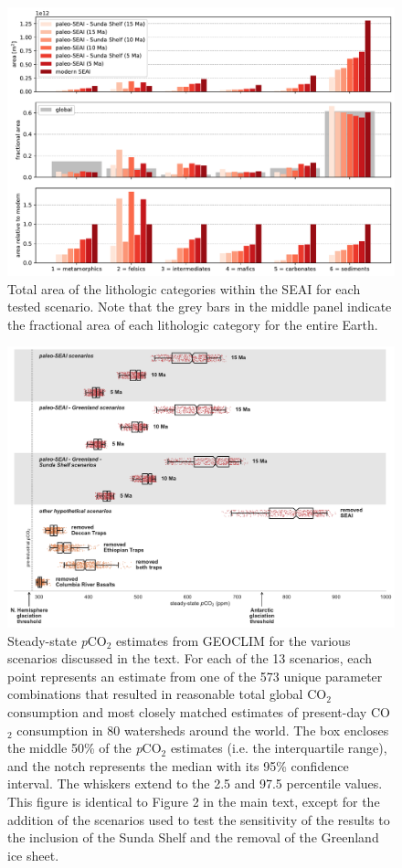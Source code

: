 \documentclass[11pt,letterpaper]{article}
\newcommand{\pCOtwo}{\textit{p}CO$_{2}$\xspace}
\newcommand{\COtwo}{CO$_{2}$\xspace}
\begin{document}
\begin{figure}[h!]
    \centering
    \includegraphics[width=1\textwidth]{Manuscript/Figures/lithology_areas.pdf}
    \caption{Total area of the lithologic categories within the SEAI for each tested scenario. Note that the grey bars in the middle panel indicate the fractional area of each lithologic category for the entire Earth.}
    \label{fig:lithology_areas}
\end{figure}

\begin{figure}[h!]
    \centering
    \includegraphics[width=1\textwidth]{Figures/scenario_pCO2_all.pdf}
    \caption{Steady-state \pCOtwo estimates from GEOCLIM for the various scenarios discussed in the text. For each of the 13 scenarios, each point represents an estimate from one of the 573 unique parameter combinations that resulted in reasonable total global \COtwo consumption and most closely matched estimates of present-day \COtwo consumption in 80 watersheds around the world. The box encloses the middle 50\% of the \pCOtwo estimates (i.e. the interquartile range), and the notch represents the median with its 95\% confidence interval. The whiskers extend to the 2.5 and 97.5 percentile values. This figure is identical to Figure 2 in the main text, except for the addition of the scenarios used to test the sensitivity of the results to the inclusion of the Sunda Shelf and the removal of the Greenland ice sheet.}
    \label{fig:scenario_pCO2_all}
\end{figure}
\end{document}
